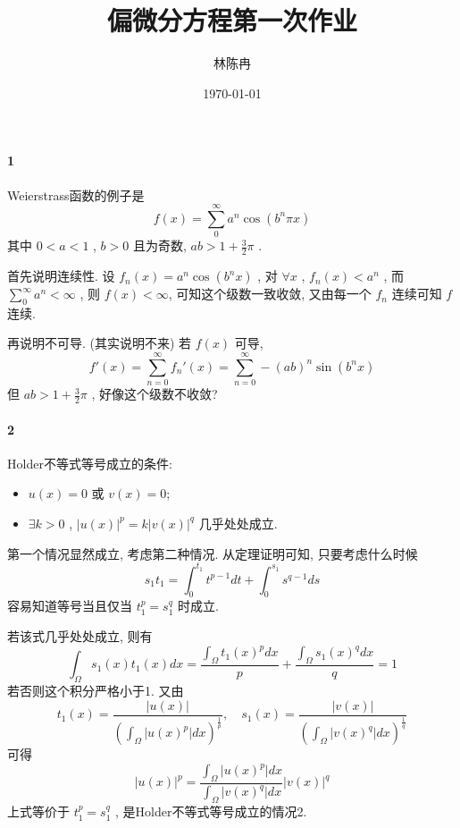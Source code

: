 \documentclass[a4paper, UTF8]{ctexart}				%
\title{偏微分方程第一次作业}
\author{林陈冉}
\date{\today}
\numberwithin{equation}{section}				%
\begin{document}
    \maketitle										%
    \paragraph{1}
        Weierstrass函数的例子是 
        \[
            f(x) = \sum^{\infty}_{0} a^n \cos (b^n \pi x)
        \]
        其中 $0 < a < 1$ , $b > 0$ 且为奇数, $ab > 1 + \frac{3}{2}\pi$ .

        首先说明连续性. 设 $f_n(x) = a^n \cos (b^n x)$ , 对 $\forall x$ , $f_n(x) < a^n$ , 而 $\sum^{\infty}_{0} a^n < \infty$ , 则 $f(x) < \infty$, 可知这个级数一致收敛, 又由每一个 $f_n$ 连续可知 $f$ 连续.
        
        再说明不可导. (其实说明不来) 若 $f(x)$ 可导, 
        \[
            f'(x) = \sum^{\infty}_{n=0} f_n'(x) = \sum^{\infty}_{n=0} - (ab)^n \sin (b^n x)
        \]
        但 $ab > 1 + \frac{3}{2} \pi$ , 好像这个级数不收敛?

    \paragraph{2}
        Holder不等式等号成立的条件: 
        \begin{itemize}
            \item $u(x) = 0$ 或 $v(x)=0$;
            \item $\exists k > 0$ , $\vert{u(x)}\vert^p = k \vert{v(x)}\vert^q$ 几乎处处成立.
        \end{itemize}

        第一个情况显然成立, 考虑第二种情况. 从定理证明可知, 只要考虑什么时候 
        \[
            s_1 t_1 = \int^{t_1}_{0} t^{p - 1}dt + \int^{s_1}_{0} s^{q - 1}ds
        \]
        容易知道等号当且仅当 $t_1^p = s_1^q$ 时成立.
        
        若该式几乎处处成立, 则有 
        \[
            \int^{}_{\Omega}s_1(x) t_1(x)dx = \frac{\int^{}_{\Omega} t_1(x)^pdx}{p} + \frac{\int^{}_{\Omega} s_1(x)^qdx}{q} = 1
        \]
        若否则这个积分严格小于1. 又由 
        \[
            t_1(x) = \frac{\vert{u(x)}\vert}{(\int^{}_{\Omega} \vert{u(x)^p}\vert dx)^{\frac{1}{p}}} , 
            \quad 
            s_1(x) = \frac{\vert{v(x)}\vert}{(\int^{}_{\Omega} \vert{v(x)^q}\vert dx)^{\frac{1}{q}}}
        \]
        可得 
        \[
            \vert{u(x)}\vert^p = \frac{\int^{}_{\Omega} \vert{u(x)^p}\vert dx}{\int^{}_{\Omega} \vert{v(x)^q}\vert dx} \vert{v(x)}\vert^q
        \]
        上式等价于 $t_1^p = s_1^q$ , 是Holder不等式等号成立的情况2.
\end{document}
